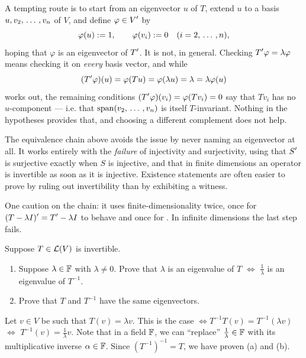 \begin{ainote}
  A tempting route is to start from an eigenvector $u$ of $T$, extend $u$ to a basis $u, v_2, {\, \ldots \,\,}, v_n$ of $V$, and define $\varphi \in \displaystyle V'$ by
  \begin{equation}
    \varphi(u) := 1, \qquad \varphi(v_i) := 0 \quad (i = 2, {\, \ldots \,\,}, n),
  \end{equation}
  hoping that $\varphi$ is an eigenvector of $\displaystyle T'$. It is not, in general. Checking $\displaystyle T'\varphi = \lambda \varphi$ means checking it on \emph{every} basis vector, and while
  \begin{equation}
    (\displaystyle T'\varphi)(u) = \varphi(Tu) = \varphi(\lambda u) = \lambda = \lambda \varphi(u)
  \end{equation}
  works out, the remaining conditions $(\displaystyle T'\varphi)(v_i) = \varphi(T v_i) = 0$ say that $T v_i$ has no $u$-component --- i.e. that $\operatorname{span} (v_2, {\, \ldots \,\,}, v_n)$ is itself $T$-invariant. Nothing in the hypotheses provides that, and choosing a different complement does not help.

  The equivalence chain above avoids the issue by never naming an eigenvector at all. It works entirely with the \emph{failure} of injectivity and surjectivity, using that $\displaystyle S'$ is surjective exactly when $S$ is injective, and that in finite dimensions an operator is invertible as soon as it is injective. Existence statements are often easier to prove by ruling out invertibility than by exhibiting a witness.

  One caution on the chain: it uses finite-dimensionality twice, once for $\displaystyle (T-\lambda I)' = \displaystyle T' - \lambda I$ to behave and once for . In infinite dimensions the last step fails.
\end{ainote}

\begin{xrcs}
  Suppose $T \in \mathcal{L}(V)$ is invertible.
  \begin{enumerate}
    \item Suppose $\lambda \in \mathbb{F}$ with $\lambda \neq 0$. Prove that $\lambda$ is an eigenvalue of $T$ $\iff$ $\frac{1}{\lambda}$ is an eigenvalue of $T^{-1}$.
    \item Prove that $T$ and $T^{-1}$ have the same eigenvectors.
  \end{enumerate}
  \begin{xsol}
    Let $v \in V$ be such that $T(v) = \lambda v$. This is the case $\iff T^{-1} T(v) = T^{-1} (\lambda v)$ $\iff$ $T^{-1} (v) = \frac{1}{\lambda} v$. Note that in a field $\mathbb{F}$, we can ``replace'' $\frac{1}{\lambda}\in \mathbb{F}$ with its multiplicative inverse $\alpha \in \mathbb{F}$. Since $\left(T^{-1}\right)^{-1} = T$, we have proven (a) and (b).
  \end{xsol}
\end{xrcs}

